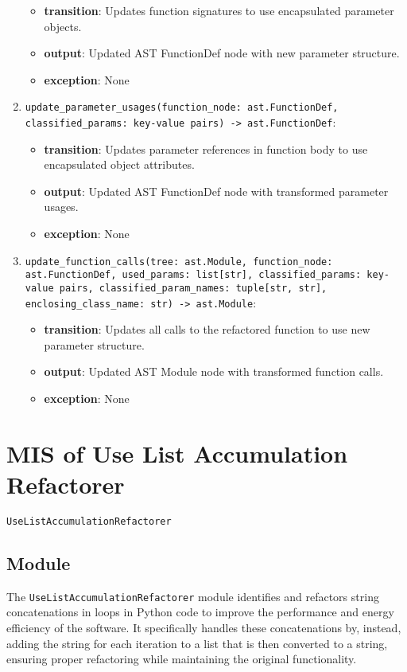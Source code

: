 \documentclass[12pt, titlepage]{article}
\begin{document}
\begin{enumerate}
  \begin{itemize}
    \item \textbf{transition}: Updates function signatures to use encapsulated parameter objects.
    \item \textbf{output}: Updated AST FunctionDef node with new parameter structure.
    \item \textbf{exception}: None
  \end{itemize}
  \item \texttt{update\_parameter\_usages(function\_node: ast.FunctionDef, classified\_params: key-value pairs) -> ast.FunctionDef}: 
  \begin{itemize}
    \item \textbf{transition}: Updates parameter references in function body to use encapsulated object attributes.
    \item \textbf{output}: Updated AST FunctionDef node with transformed parameter usages.
    \item \textbf{exception}: None
  \end{itemize}
  \item \texttt{update\_function\_calls(tree: ast.Module, function\_node: ast.FunctionDef, used\_params: list[str], classified\_params: key-value pairs, classified\_param\_names: tuple[str, str], enclosing\_class\_name: str) -> ast.Module}: 
  \begin{itemize}
    \item \textbf{transition}: Updates all calls to the refactored function to use new parameter structure.
    \item \textbf{output}: Updated AST Module node with transformed function calls.
    \item \textbf{exception}: None
  \end{itemize}
  \end{enumerate}

  \section{MIS of Use List Accumulation Refactorer} \label{mis:ListAccum}

  \texttt{UseListAccumulationRefactorer}
  
  \subsection{Module}
  
  The \texttt{UseListAccumulationRefactorer} module identifies and refactors 
  string concatenations in loops in Python code to improve the performance and energy efficiency of the software. It specifically handles these concatenations by, instead, adding the string for each iteration to a list that is then converted to a string, ensuring proper refactoring while maintaining the original functionality.
  
\end{document}
